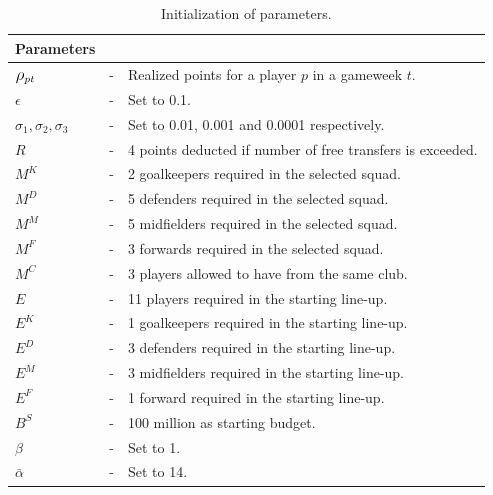 \begin{table}[H] 
\tabcolsep=0.11cm
\label{initialization_of_parameters}
\centering
\caption{Initialization of parameters.}
\begin{tabular}{@{}lll@{}}
\toprule
Parameters                       &   &                                                                                                \\ \midrule
$\mathlarger{\rho_{pt}}$ & - & Realized points for a player $p$ in a gameweek $t$. \\
$\epsilon$                       & - & Set to 0.1.                                                                     \\
$\sigma_{1}, \sigma_{2}, \sigma_{3} $                     & - & Set to 0.01, 0.001 and 0.0001 respectively.                                               \\
$R$                              & - & 4 points deducted if number of free transfers is exceeded.       \\
$M^{K}$                          & - &  2 goalkeepers required in the selected squad.                                      \\
$M^{D}$                          & - &  5 defenders required in the selected squad.                         \\
$M^{M}$                          & - & 5 midfielders required in the selected squad.                                     \\
$M^{F}$                          & - & 3 forwards required in the selected squad.                                    \\
$M^{C}$                          & - & 3 players allowed to have from the same club.                                \\
$E$                              & - & 11 players required in the starting line-up.                              \\
$E^{K}$                          & - & 1 goalkeepers required in the starting line-up.                                       \\
$E^{D}$                          & - & 3 defenders required in the starting line-up.                  \\
$E^{M}$                          & - & 3 midfielders required in the starting line-up.                                 \\
$E^{F}$                          & - & 1 forward required in the starting line-up.                     \\
$B^{S}$                          & - & 100 million as starting budget.                                                                              \\
$\beta$                          & - & Set to 1.                                                                                  \\          
$\bar{\alpha}$                   & - & Set to 14.                                                                      \\


\end{tabular}
\end{table}
